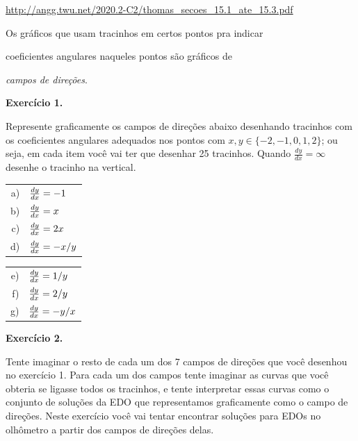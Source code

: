 \documentclass[oneside,12pt]{article}
\begin{document}
{
\footnotesize

\url{http://angg.twu.net/2020.2-C2/thomas_secoes_15.1_ate_15.3.pdf}

}

\ssk

Os gráficos que usam tracinhos em certos pontos pra indicar

coeficientes angulares naqueles pontos são gráficos de

{\sl campos de direções}.

\msk



{\bf Exercício 1.}

Represente graficamente os campos de direções abaixo desenhando
tracinhos com os coeficientes angulares adequados nos pontos com
$x,y∈\{-2,-1,0,1,2\}$; ou seja, em cada item você vai ter que desenhar
25 tracinhos. Quando $\frac{dy}{dx} = ∞$ desenhe o tracinho na
vertical.

\msk

\begin{tabular}[t]{rl}
a) & $\frac{dy}{dx} = -1$ \\
b) & $\frac{dy}{dx} = x$ \\
c) & $\frac{dy}{dx} = 2x$ \\
d) & $\frac{dy}{dx} = -x/y$ \\
\end{tabular}
\qquad
\begin{tabular}[t]{rl}
e) & $\frac{dy}{dx} = 1/y$ \\
f) & $\frac{dy}{dx} = 2/y$ \\
g) & $\frac{dy}{dx} = -y/x$ \\
\end{tabular}

\newpage


{\bf Exercício 2.}

Tente imaginar o resto de cada um dos 7 campos de direções que você
desenhou no exercício 1. Para cada um dos campos tente imaginar as
curvas que você obteria se ligasse todos os tracinhos, e tente
interpretar essas curvas como o conjunto de soluções da EDO que
representamos graficamente como o campo de direções. Neste exercício
você vai tentar encontrar soluções para EDOs no olhômetro a partir dos
campos de direções delas.
\end{document}
